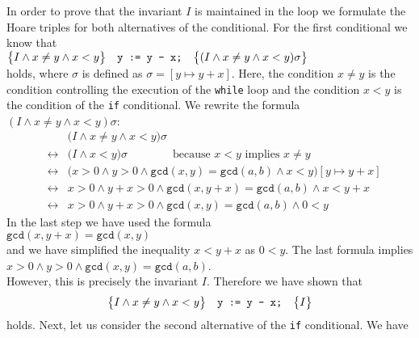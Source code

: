 In order to prove that the invariant $I$ is maintained in the loop we formulate the Hoare triples
for both alternatives of the conditional.  For the first conditional we know that
\\[0.2cm]
\hspace*{1.3cm}
$\bigl\{I \wedge x \not= y \wedge x < y\bigr\}\quad\texttt{y := y - x;}\quad\bigl\{(I \wedge x \not= y \wedge x < y)\sigma\bigr\}$
\\[0.2cm]
holds, where $\sigma$ is defined as $\sigma = [y \mapsto y + x]$.  Here, the condition $x \not= y$
is the condition controlling the execution of the  
\texttt{while} loop and the condition $x < y$ is the condition of the \texttt{if} conditional.
We rewrite the formula $(I \wedge x \not= y \wedge x < y)\sigma$:
\begin{eqnarray*}
 &                 & \bigl(I \wedge x \not= y \wedge x < y\bigr)\sigma \\
 & \leftrightarrow & \bigl(I \wedge x < y\bigr)\sigma 
                     \qquad\qquad \mbox{because $x < y$ implies $x \not= y$} \\
 & \leftrightarrow & \bigl(x > 0 \wedge y > 0 \wedge \texttt{gcd}(x,y) = \texttt{gcd}(a,b) \wedge 
                     x < y\bigr)[y \mapsto y + x] \\
 & \leftrightarrow & x > 0 \wedge y + x > 0 \wedge \texttt{gcd}(x,y+x) = \texttt{gcd}(a,b)
                     \wedge x < y + x \\
 & \leftrightarrow & x > 0 \wedge y + x > 0 \wedge \texttt{gcd}(x,y) = \texttt{gcd}(a,b) \wedge 0 < y
\end{eqnarray*}
In the last step we have used the formula
\\[0.2cm]
\hspace*{1.3cm}
$ \texttt{gcd}(x,y+x) = \texttt{gcd}(x,y) $
\\[0.2cm]
and we have simplified the inequality $x < y + x$ as $0 < y$.
The last formula implies
\\[0.2cm]
\hspace*{1.3cm}
$ x > 0 \wedge y > 0 \wedge \texttt{gcd}(x,y) = \texttt{gcd}(a,b) $.
\\[0.2cm]
However, this is precisely the invariant $I$.  Therefore we have shown that
\begin{equation}
  \label{eq:if1}
  \bigl\{I \wedge x \not= y \wedge x < y\bigr\}\quad\texttt{y := y - x;}\quad\bigl\{I\bigr\}
\end{equation}
holds.  Next, let us consider the second alternative of the \texttt{if} conditional.  We have
\\[0.2cm]
\hspace*{1.3cm}
